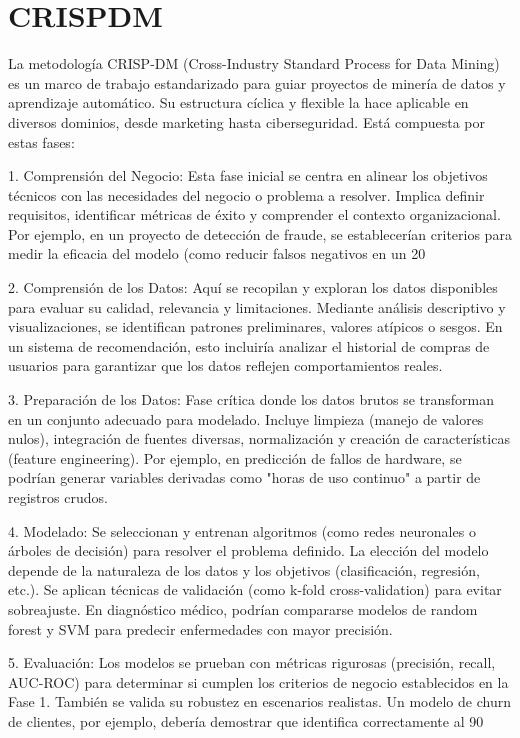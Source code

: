 
\section{CRISPDM}
La metodología CRISP-DM (Cross-Industry Standard Process for Data Mining) es un marco de trabajo estandarizado para guiar proyectos de minería de datos y aprendizaje automático. Su estructura cíclica y flexible la hace aplicable en diversos dominios, desde marketing hasta ciberseguridad. Está compuesta por estas fases:

1. Comprensión del Negocio: Esta fase inicial se centra en alinear los objetivos técnicos con las necesidades del negocio o problema a resolver. Implica definir requisitos, identificar métricas de éxito y comprender el contexto organizacional. Por ejemplo, en un proyecto de detección de fraude, se establecerían criterios para medir la eficacia del modelo (como reducir falsos negativos en un 20%

2. Comprensión de los Datos: Aquí se recopilan y exploran los datos disponibles para evaluar su calidad, relevancia y limitaciones. Mediante análisis descriptivo y visualizaciones, se identifican patrones preliminares, valores atípicos o sesgos. En un sistema de recomendación, esto incluiría analizar el historial de compras de usuarios para garantizar que los datos reflejen comportamientos reales.  

3. Preparación de los Datos: Fase crítica donde los datos brutos se transforman en un conjunto adecuado para modelado. Incluye limpieza (manejo de valores nulos), integración de fuentes diversas, normalización y creación de características (feature engineering). Por ejemplo, en predicción de fallos de hardware, se podrían generar variables derivadas como "horas de uso continuo" a partir de registros crudos.  

4. Modelado: Se seleccionan y entrenan algoritmos (como redes neuronales o árboles de decisión) para resolver el problema definido. La elección del modelo depende de la naturaleza de los datos y los objetivos (clasificación, regresión, etc.). Se aplican técnicas de validación (como k-fold cross-validation) para evitar sobreajuste. En diagnóstico médico, podrían compararse modelos de random forest y SVM para predecir enfermedades con mayor precisión.  

5. Evaluación: Los modelos se prueban con métricas rigurosas (precisión, recall, AUC-ROC) para determinar si cumplen los criterios de negocio establecidos en la Fase 1. También se valida su robustez en escenarios realistas. Un modelo de churn de clientes, por ejemplo, debería demostrar que identifica correctamente al 90%

